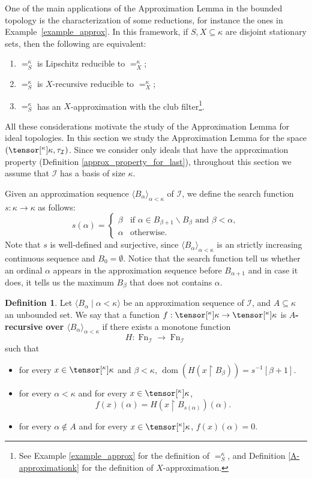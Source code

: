 \documentclass{amsart}
\numberwithin{equation}{section}
\newcommand{\I}{\mathcal{I}}
\newcommand{\pre}[2]{\tensor[^{#1}]{#2}{}}
\newcommand{\seq}[2]{\langle #1 \mid #2 \rangle}
\newcommand{\markdef}[1]{\textbf{#1}}
\newcommand{\1}{\mathbf{I}}
\newcommand{\2}{\mathbf{II}}
\renewcommand{\k}{\kappa}
\DeclareMathOperator{\dom}{dom}
\DeclareMathOperator{\Fn}{Fn}
\theoremstyle{definition}
\newtheorem{definition}[theorem]{Definition}
\theoremstyle{remark}
\begin{document}
One of the main applications of the Approximation Lemma in the bounded topology is the characterization of some reductions, for instance the ones in Example~\ref{example_approx}.
In this framework, if $S,X\subseteq \k$ are disjoint stationary sets, then the following are equivalent:
\begin{enumerate}[label={\upshape (\arabic*)}, leftmargin=2pc]
    \item $=_S^\k$ is Lipschitz reducible to $=_X^\k$; 
    \item $=_S^\k$ is $X$-recursive reducible to $=_X^\k$;
    \item $=_S^\k$ has an $X$-approximation with the club filter\footnote{See Example \ref{example_approx} for the definition of $=_S^\k$, and Definition \ref{A-approximationk} for the definition of $X$-approximation.}.
\end{enumerate}
All these considerations motivate the study of the Approximation Lemma for ideal topologies.
In this section we study the Approximation Lemma for the space \((\pre{\k}{\k}, \tau_\I)\).
Since we consider only ideals that have the approximation property  (Definition \ref{approx_property_for_last}),  throughout this section we assume that $\mathcal{I}$ has a basis of size $\kappa$.


Given an approximation sequence $\langle B_\alpha\rangle_{\alpha<\kappa}$ of $\mathcal{I}$, we define the search function $s:\kappa\rightarrow\kappa$ as follows:
$$s(\alpha)=\begin{cases} \beta &\mbox{if }\alpha\in B_{\beta+1}\backslash B_\beta \mbox{ and } \beta<\alpha,\\
    \alpha & 
    \text{otherwise.}\end{cases}$$  
Note that $s$ is well-defined and surjective, since $\langle B_\alpha\rangle_{\alpha<\kappa}$ is an strictly increasing continuous sequence and $B_0=\emptyset$.
Notice that the search function tell us whether an ordinal $\alpha$ appears in the approximation sequence before $B_{\alpha+1}$ and in case it does, it tells us the maximum $B_\beta$ that does not contains $\alpha$. 

\begin{definition}
    Let $\seq{B_\alpha}{\alpha<\kappa}$ be an approximation sequence of $\mathcal{I}$, and $A\subseteq \kappa$ an unbounded set. We say that a function $f:\pre{\k}{\kappa}\rightarrow\pre{\k}{\kappa}$ is \markdef{$A$-recursive over $\langle B_\alpha\rangle_{\alpha<\kappa}$} if there exists a monotone function $$H:\Fn_{\I}\rightarrow \Fn_{\I}$$ such that
    \begin{itemize}
        \item for every $x\in \pre{\k}{\kappa}$ and $\beta<\kappa$, $\dom (H(x\restriction B_\beta))=s^{-1}[\beta+1]$.
        \item for every $\alpha<\kappa$ and for every $x\in \pre{\k}{\kappa}$, 
           $$f(x)(\alpha)=H(x\restriction B_{s(\alpha)})(\alpha).$$ 
        \item for every $\alpha\notin A$ and for every $x\in \pre{\k}{\kappa}$, $f(x)(\alpha)=0$.
    \end{itemize}
           
\end{definition}
\end{document}
